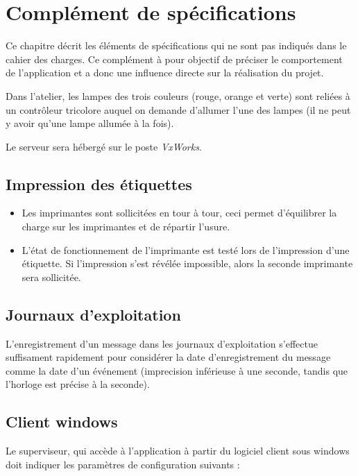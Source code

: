 \chapter{Complément de spécifications}

Ce chapitre décrit les éléments de spécifications qui ne sont pas indiqués dans
le cahier des charges. Ce complément à pour objectif de préciser le
comportement de l'application et a donc une influence directe sur la
réalisation du projet.

Dans l'atelier, les lampes des trois couleurs (rouge, orange et verte) sont
reliées à un contrôleur tricolore auquel on demande d'allumer l'une des lampes
(il ne peut y avoir qu'une lampe allumée à la fois).

Le serveur sera hébergé sur le poste \textit{VxWorks}.

\section{Impression des étiquettes}

\begin{itemize}
	\item Les imprimantes sont sollicitées en tour à tour, ceci permet
d'équilibrer la charge sur les imprimantes et de répartir l'usure.
	\item L'état de fonctionnement de l'imprimante est testé lors de
l'impression d'une étiquette. Si l'impression s'est révélée impossible, alors
la seconde imprimante sera sollicitée.
\end{itemize}

\section{Journaux d'exploitation}

L'enregistrement d'un message dans les journaux d'exploitation s'effectue
suffisament rapidement pour considérer la date d'enregistrement du message
comme la date d'un événement (imprecision inférieuse à une seconde, tandis que
l'horloge est précise à la seconde).

\section{Client windows}

Le superviseur, qui accède à l'application à partir du logiciel client sous
windows doit indiquer les paramètres de configuration suivants :

